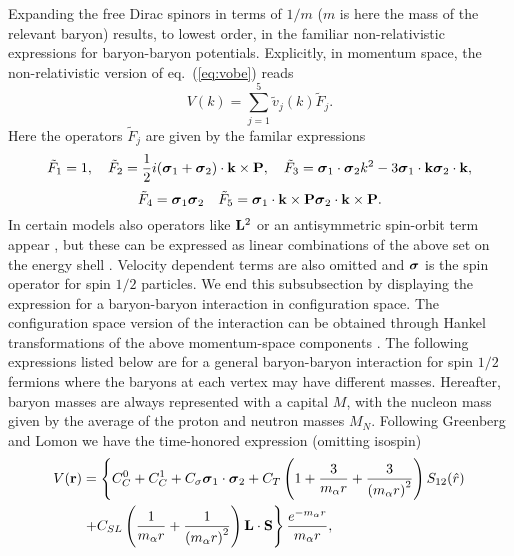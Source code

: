Expanding the free Dirac spinors
in terms of $1/m$ ($m$ is here the mass of the relevant baryon) 
results, to lowest order, in the familiar non-relativistic
expressions for baryon-baryon potentials. Explicitly, in momentum space, 
the non-relativistic version of eq.\
(\ref{eq:vobe}) reads
\begin{equation}
   V(k)=
   \sum_{j=1}^{5} \tilde{v}_j(k)\tilde{F}_j.
   \label{eq:vobek}
\end{equation}
Here the operators $\tilde{F}_j$ are given by the familar expressions 
\begin{equation}
\tilde{F}_1=1, \quad \tilde{F}_2={1\over2}i(\mbox{\boldmath $\sigma$}_1
+\mbox{\boldmath $\sigma$}_2)\cdot {\bf k}\times {\bf P},
\quad \tilde{F}_3=\mbox{\boldmath $\sigma$}_1\cdot
\mbox{\boldmath $\sigma$}_2k^2
-3\mbox{\boldmath $\sigma$}_1\cdot {\bf k}
\mbox{\boldmath $\sigma$}_2\cdot {\bf k},
\end{equation}
\begin{equation}
\tilde{F}_4=\mbox{\boldmath $\sigma$}_1\mbox{\boldmath $\sigma$}_2
\quad \tilde{F}_5=\mbox{\boldmath $\sigma$}_1\cdot {\bf k}\times {\bf P}
\mbox{\boldmath $\sigma$}_2\cdot {\bf k}\times {\bf P}.
\end{equation}
In certain models also operators like ${\bf L}^2$ or an antisymmetric
spin-orbit term
appear \cite{mac89,lomon92}, but these can be expressed as linear combinations
of the above set on the energy shell \cite{br92}. Velocity dependent terms are also
omitted and $\mbox{\boldmath $\sigma$}$ is the spin operator
for spin $1/2$ particles.
We end this subsubsection by displaying the expression for a baryon-baryon
interaction in configuration space.
The configuration space version of the interaction can be obtained through Hankel
transformations of the above
momentum-space components \cite{br92}.  The following
expressions listed below are for a general baryon-baryon interaction for
spin $1/2$ fermions where
the baryons at each vertex may have different masses. Hereafter, baryon
masses are always represented with a capital $M$, with the nucleon mass
given by the average of the proton and neutron masses $M_N$. Following
Greenberg and Lomon \cite{lomon92} we have the
time-honored expression (omitting isospin)
\begin{eqnarray}
V({\bf r})&= \left\{ C^0_C + C^1_C + C_\sigma 
\mbox{\boldmath $\sigma$}_1\cdot\mbox{\boldmath $\sigma$}_2
 + C_T \left( 1 + {3\over m_\alpha r} + {3\over
\left(m_\alpha r\right)^2}
\right) S_{12} (\hat r)\right. \\ \nonumber 
&\left. + C_{SL} \left( {1\over m_\alpha r} + {1\over \left( m_\alpha r\right)^2}
\right) {\bf L}\cdot {\bf S}
\right\} \frac{e^{-m_\alpha r}}{m_\alpha r},
\end{eqnarray}
